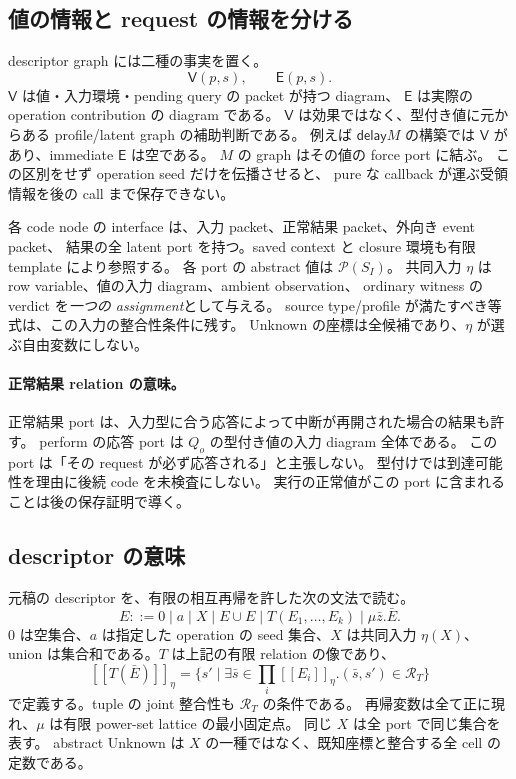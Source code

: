 \documentclass[11pt,a4paper]{article}
\newcommand{\Delay}{\mathsf{delay}}
\newcommand{\llbracket}{[\![}
\newcommand{\rrbracket}{]\!]}
\begin{document}
\subsection{値の情報と request の情報を分ける}

descriptor graph には二種の事実を置く。
\[
 \mathsf V(p,s),\qquad \mathsf E(p,s).
\]
\(\mathsf V\) は値・入力環境・pending query の packet が持つ diagram、
\(\mathsf E\) は実際の operation contribution の diagram である。
\(\mathsf V\) は効果ではなく、型付き値に元からある profile/latent graph の補助判断である。
例えば \(\Delay M\) の構築では \(\mathsf V\) があり、immediate \(\mathsf E\) は空である。
\(M\) の graph はその値の force port に結ぶ。
この区別をせず operation seed だけを伝播させると、
pure な callback が運ぶ受領情報を後の call まで保存できない。

各 code node の interface は、入力 packet、正常結果 packet、外向き event packet、
結果の全 latent port を持つ。saved context と closure 環境も有限 template により参照する。
各 port の abstract 値は \(\mathcal P(S_I)\)。
共同入力 \(\eta\) は row variable、値の入力 diagram、ambient observation、
ordinary witness の verdict を\emph{一つの assignment}として与える。
source type/profile が満たすべき等式は、この入力の整合性条件に残す。
Unknown の座標は全候補であり、\(\eta\) が選ぶ自由変数にしない。

\paragraph{正常結果 relation の意味。}
正常結果 port は、入力型に合う応答によって中断が再開された場合の結果も許す。
perform の応答 port は \(Q_o\) の型付き値の入力 diagram 全体である。
この port は「その request が必ず応答される」と主張しない。
型付けでは到達可能性を理由に後続 code を未検査にしない。
実行の正常値がこの port に含まれることは後の保存証明で導く。

\subsection{descriptor の意味}

元稿の descriptor を、有限の相互再帰を許した次の文法で読む。
\[
 E::=0\mid a\mid X\mid E\cup E\mid T(E_1,\ldots,E_k)\mid\mu\bar z.\bar E.
\]
\(0\) は空集合、\(a\) は指定した operation の seed 集合、\(X\) は共同入力 \(\eta(X)\)、
union は集合和である。\(T\) は上記の有限 relation の像であり、
\[
 \llbracket T(\bar E)\rrbracket_\eta
 =\{s'\mid \exists\bar s\in\prod_i\llbracket E_i\rrbracket_\eta.
       (\bar s,s')\in\mathcal R_T\}
\]
で定義する。tuple の joint 整合性も \(\mathcal R_T\) の条件である。
再帰変数は全て正に現れ、\(\mu\) は有限 power-set lattice の最小固定点。
同じ \(X\) は全 port で同じ集合を表す。
abstract Unknown は \(X\) の一種ではなく、既知座標と整合する全 cell の定数である。
\end{document}
